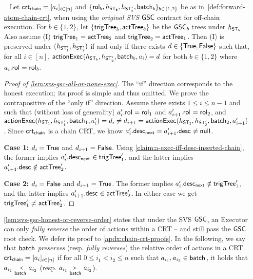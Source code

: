 \begin{lemma}~\label{lem:svs-gsc-all-or-none-exec}
    Let $\mathsf{crt_{chain}} = [a_i]_{i \in [n]}$ and $\{\mathsf{rol}_{b}, h_{\mathsf{ST_{b}}}, h_{\mathsf{ST_{b}'}}, \mathsf{batch}_{b}\}_{b \in \{1,2\}}$ be as in~\cref{def:forward-atom-chain-crt}, when using the \emph{original SVS} $\mathsf{GSC}$ contract for off-chain execution. For $b \in \{1,2\}$, let $\{\mathsf{trigTree}_b, \mathsf{actTree}_b \}$ be the $\mathsf{GSC}_b$ trees under $h_{\mathsf{ST_{b}}}$.
    Also assume (I) $\mathsf{trigTree}_1 = \mathsf{actTree}_2$ and $\mathsf{trigTree}_2 = \mathsf{actTree}_1$.
    Then (I) is preserved under $(h_{\mathsf{ST_{1}'}}, h_{\mathsf{ST_{2}'}})$ if and only if there exists $d \in \{\mathsf{True}, \mathsf{False}\}$ such that, for all $i \in [n]$, $\mathsf{actionExec}_{}(h_{\mathsf{ST_{b}}}, h_{\mathsf{ST_{b}'}}, \mathsf{batch}_{b}, a_i) = d$ for both $b \in \{1,2\}$ where $a_i.\mathsf{rol}_{} = \mathsf{rol}_{b}$.
\end{lemma}

\begin{proof}[Proof of \cref{lem:svs-gsc-all-or-none-exec}]
    The ``if'' direction corresponds to the honest execution; its proof is simple and thus omitted. We prove the contrapositive of the ``only if'' direction. Assume there exists $1 \leq i \leq n-1$ and such that (without loss of generality)  $a_{i}'.\mathsf{rol}_{} = \mathsf{rol}_{1}$ and $a_{i + 1}'.\mathsf{rol}_{} = \mathsf{rol}_{2}$, and $\mathsf{actionExec}_{}(h_{\mathsf{ST_{1}}}, h_{\mathsf{ST_{1}'}}, \mathsf{batch}_{1}, a_{i}') = d_i \neq d_{i+1} = \mathsf{actionExec}_{}(h_{\mathsf{ST_{2}}}, h_{\mathsf{ST_{2}'}}, \mathsf{batch}_{2}, a_{i+1}')$. Since $\mathsf{crt_{chain}}$ is a chain CRT, we know $a_i'.\mathsf{desc_{next}}_{} = a_{i+1}'.\mathsf{desc}_{} \neq \mathsf{null}$.
    
    \noindent\textbf{Case 1:} $d_i = \mathsf{True}$ and $d_{i+1} = \mathsf{False}$. Using \cref{claim:a-exec-iff-desc-inserted-chain}, the former implies $a_{i}'.\mathsf{desc_{next}}_{} \in \mathsf{trigTree}_{1}'$, and the latter implies $a_{i+1}'.\mathsf{desc}_{} \notin \mathsf{actTree}_{2}'$.
            
    \noindent\textbf{Case 2:} $d_i = \mathsf{False}$ and $d_{i+1} = \mathsf{True}$. The former implies $a_{i}'.\mathsf{desc_{next}}_{} \notin \mathsf{trigTree}_{1}'$, and the latter implies $a_{i+1}'.\mathsf{desc}_{} \in \mathsf{actTree}_{2}' $.
    In either case we get $\mathsf{trigTree}_{1}' \neq \mathsf{actTree}_{2}'$.
\end{proof}

\cref{lem:svs-gsc-honest-or-reverse-order} states that under the SVS $\mathsf{GSC}$, an Executor can only \emph{fully reverse} the order of actions within a CRT -- and still pass the $\mathsf{GSC}$ root check. We defer its proof to \cref{apdx:chain-crt-proofs}. In the following, we say that $\mathsf{batch}_{}$ \emph{preserves} (resp. \emph{fully reverses}) the relative order of actions in a CRT $\mathsf{crt_{chain}} = [a_i]_{i \in [n]}$ if for all $0 \leq i_1 < i_2 \leq n$ such that $a_{i_1}, a_{i_2} \in \mathsf{batch}_{}$, it holds that $a_{i_1} \underset{\mathsf{batch}_{}}{\prec} a_{i_2}$  (resp. $a_{i_1} \underset{\mathsf{batch}_{}}{\succ} a_{i_2}$).

